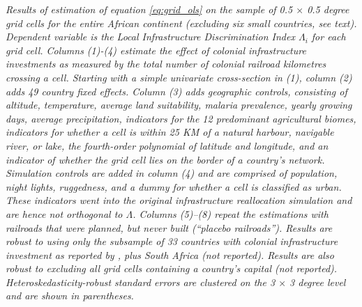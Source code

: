 \documentclass[11pt, oneside]{article}   	%
\newcommand{\mysubcaption}[1]{
\justify
\begin{spacing}{0.7}
\textit{\footnotesize #1}
\end{spacing}}
\begin{document}
\begin{table}[t]
\mysubcaption{Results of estimation of equation \eqref{eq:grid_ols} on the sample of 0.5 $\times$ 0.5 degree grid cells for the entire African continent (excluding six small countries, see text). Dependent variable is the Local Infrastructure Discrimination Index $\Lambda_{i}$ for each grid cell. Columns (1)-(4) estimate the effect of colonial infrastructure investments as measured by the total number of colonial railroad kilometres crossing a cell. Starting with a simple univariate cross-section in (1), column (2) adds 49 country fixed effects. Column (3) adds geographic controls, consisting of altitude, temperature, average land suitability, malaria prevalence, yearly growing days, average precipitation, indicators for the 12 predominant agricultural biomes, indicators for whether a cell is within 25 KM of a natural harbour, navigable river, or lake, the fourth-order polynomial of latitude and longitude, and an indicator of whether the grid cell lies on the border of a country's network. Simulation controls are added in column (4) and are comprised of population, night lights, ruggedness, and a dummy for whether a cell is classified as urban. These indicators went into the original infrastructure reallocation simulation and are hence not orthogonal to $\Lambda$. Columns (5)--(8) repeat the estimations with railroads that were planned, but never built (``placebo railroads''). Results are robust to using only the subsample of 33 countries with colonial infrastructure investment as reported by \cite{Jedwab_PermanentEffectsTransportation_2016a}, plus South Africa (not reported). Results are also robust to excluding all grid cells containing a country's capital (not reported). Heteroskedasticity-robust standard errors are clustered on the 3 $\times$ 3 degree level and are shown in parentheses.}
\end{table}
\end{document}
